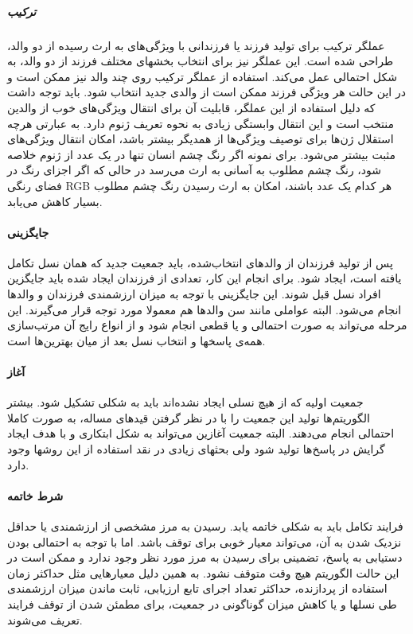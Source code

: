 \documentclass{report}
\begin{document}
\subparagraph{ترکیب}
عملگر ترکیب برای تولید فرزند یا فرزندانی با ویژگی‌های به ارث رسیده از دو والد، طراحی شده است. این عملگر نیز برای انتخاب بخشهای مختلف فرزند از دو والد، به شکل احتمالی عمل می‌کند. استفاده از عملگر ترکیب روی چند والد نیز ممکن است و در این حالت هر ویژگی فرزند ممکن است از والدی جدید انتخاب شود. باید توجه داشت که دلیل استفاده از این عملگر، قابلیت آن برای انتقال ویژگی‌های خوب از والدین منتخب است و این انتقال وابستگی زیادی به نحوه تعریف ژنوم دارد. به عبارتی هرچه استقلال ژن‌ها برای توصیف ویژگی‌ها از همدیگر بیشتر باشد، امکان انتقال ویژگی‌های مثبت بیشتر می‌شود. برای نمونه اگر رنگ چشم انسان تنها در یک عدد از ژنوم خلاصه شود، رنگ چشم مطلوب به آسانی به ارث می‌رسد در حالی که اگر اجزای رنگ در فضای رنگی RGB هر کدام یک عدد باشند، امکان به ارث رسیدن رنگ چشم مطلوب بسیار کاهش می‌یابد.

\paragraph{جایگزینی}
پس از تولید فرزندان از والدهای انتخاب‌شده، باید جمعیت جدید که همان نسل تکامل یافته است، ایجاد شود. برای انجام این کار، تعدادی از فرزندان ایجاد شده باید جایگزین افراد نسل قبل شوند. این جایگزینی با توجه به میزان ارزشمندی فرزندان و والدها انجام می‌شود. البته عواملی مانند سن والدها هم معمولا مورد توجه قرار می‌گیرند. این مرحله می‌تواند به صورت احتمالی و یا قطعی انجام شود و از انواع رایج آن مرتب‌سازی همه‌ی پاسخها و انتخاب نسل بعد از میان بهترین‌ها است.

\paragraph{آغاز}
جمعیت اولیه که از هیچ نسلی ایجاد نشده‌اند باید به شکلی تشکیل شود. بیشتر الگوریتم‌ها تولید این جمعیت را با در نظر گرفتن قیدهای مساله، به صورت کاملا احتمالی انجام می‌دهند. البته جمعیت آغازین می‌تواند به شکل ابتکاری و با هدف ایجاد گرایش در پاسخ‌ها تولید شود ولی بحثهای زیادی در نقد استفاده از این روشها وجود دارد.

\paragraph{شرط خاتمه}
فرایند تکامل باید به شکلی خاتمه یابد. رسیدن به مرز مشخصی از ارزشمندی یا حداقل نزدیک شدن به آن، می‌تواند معیار خوبی برای توقف باشد. اما با توجه به احتمالی بودن دستیابی به پاسخ، تضمینی برای رسیدن به مرز مورد نظر وجود ندارد و ممکن است در این حالت الگوریتم هیچ وقت متوقف نشود. به همین دلیل معیارهایی مثل حداکثر زمان استفاده از پردازنده، حداکثر تعداد اجرای تابع ارزیابی، ثابت ماندن میزان ارزشمندی طی نسلها و یا کاهش میزان گوناگونی در جمعیت، برای مطمئن شدن از توقف فرایند تعریف می‌شوند. 
\end{document}
